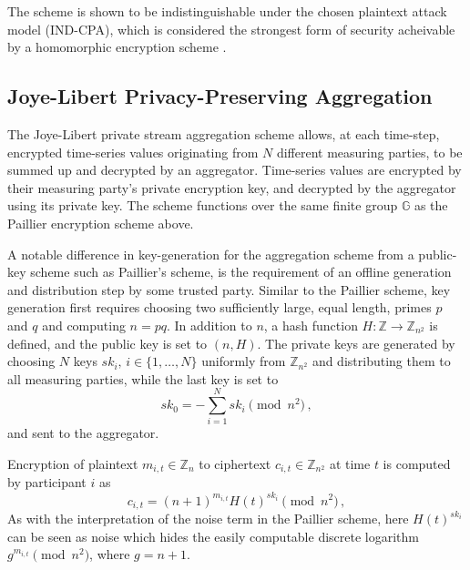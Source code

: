 \documentclass[twocolumn]{autart}    %
\begin{document}
The scheme is shown to be indistinguishable under the chosen plaintext attack model (IND-CPA), which is considered the strongest form of security acheivable by a homomorphic encryption scheme \cite{}.

\subsection{Joye-Libert Privacy-Preserving Aggregation}
The Joye-Libert private stream aggregation scheme allows, at each time-step, encrypted time-series values originating from $N$ different measuring parties, to be summed up and decrypted by an aggregator. Time-series values are encrypted by their measuring party's private encryption key, and decrypted by the aggregator using its private key. The scheme functions over the same finite group $\mathbb{G}$ as the Paillier encryption scheme above.

A notable difference in key-generation for the aggregation scheme from a public-key scheme such as Paillier's scheme, is the requirement of an offline generation and distribution step by some trusted party. Similar to the Paillier scheme, key generation first requires choosing two sufficiently large, equal length, primes $p$ and $q$ and computing $n=pq$. In addition to $n$, a hash function $H:\mathbb{Z} \rightarrow \mathbb{Z}_{n^2}$ is defined, and the public key is set to $(n, H)$. The private keys are generated by choosing $N$ keys $sk_i,\,i \in \{1,\dots,N\}$ uniformly from $\mathbb{Z}_{n^2}$ and distributing them to all measuring parties, while the last key is set to
\begin{equation}
    sk_0 = -\sum^{N}_{i=1}sk_i \pmod{n^2}\,,
\end{equation}
and sent to the aggregator.

Encryption of plaintext $m_{i,t} \in \mathbb{Z}_n$ to ciphertext $c_{i,t} \in \mathbb{Z}_{n^2}$ at time $t$ is computed by participant $i$ as
\begin{equation}
    c_{i,t} = (n+1)^{m_{i,t}} H(t)^{sk_i} \pmod{n^2}\,,
\end{equation}
As with the interpretation of the noise term in the Paillier scheme, here $H(t)^{sk_i}$ can be seen as noise which hides the easily computable discrete logarithm $g^{m_{i,t}} \pmod{n^2}$, where $g=n+1$.
\end{document}
